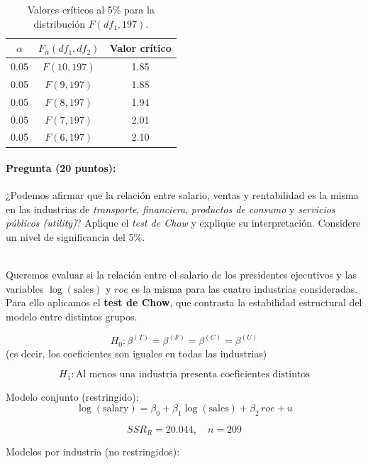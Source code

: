 \documentclass[10pt,a4paper]{article}
\begin{document}
\begin{enumerate}
\begin{center}
\begin{tabular}{lcc}
\bottomrule
\end{tabular}
\end{center}

\vspace{0.5cm}

\begin{table}[h!]
\centering
\begin{tabular}{ccc}
\hline
$\alpha$ & $F_{\alpha}(df_1, df_2)$ & Valor crítico \\ \hline
0.05 & $F(10,197)$ & 1.85 \\
0.05 & $F(9,197)$  & 1.88 \\
0.05 & $F(8,197)$  & 1.94 \\
0.05 & $F(7,197)$  & 2.01 \\
0.05 & $F(6,197)$  & 2.10 \\ \hline
\end{tabular}
\caption{Valores críticos al 5\% para la distribución $F(df_1,197)$.}
\end{table}

\paragraph{Pregunta (20 puntos):}
¿Podemos afirmar que la relación entre salario, ventas y rentabilidad es la misma en las 
industrias de \textit{transporte}, \textit{financiera}, \textit{productos de consumo} y 
\textit{servicios públicos (utility)}? 
Aplique el \textit{test de Chow} y explique 
su interpretación. Considere un nivel de significancia del 5\%.

\\
\color{blue}
Queremos evaluar si la relación entre el salario de los presidentes ejecutivos y las variables
$\log(\text{sales})$ y $roe$ es la misma para las cuatro industrias consideradas.
Para ello aplicamos el \textbf{test de Chow}, que contrasta la estabilidad estructural del modelo
entre distintos grupos.

\[
H_0: \beta^{(T)} = \beta^{(F)} = \beta^{(C)} = \beta^{(U)}
\]
(es decir, los coeficientes son iguales en todas las industrias)

\[
H_1: \text{Al menos una industria presenta coeficientes distintos}
\]


Modelo conjunto (restringido):
\[
\log(\text{salary}) = \beta_0 + \beta_1 \log(\text{sales}) + \beta_2 \, roe + u
\]

\[
SSR_R = 20.044, \quad n = 209
\]

Modelos por industria (no restringidos):


\end{enumerate}
\end{document}

